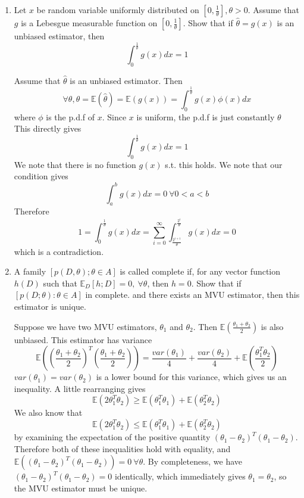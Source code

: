 \documentclass{article}
\newcommand{\chapternumber}{3}
\newenvironment{QandA}{\begin{enumerate}[label=\chapternumber.\arabic*]\bfseries\boldmath}
	{\end{enumerate}}
\newenvironment{answered}{\par\bigskip\normalfont\unboldmath}{}
\begin{document}
\begin{QandA}
		\item Let $x$ be random variable uniformly distributed on $[0,\frac{1}{\theta}],\theta>0$. Assume that $g$ is a Lebesgue measurable function on $[0,\frac{1}{\theta}]$. Show that if $\hat{\theta}=g(x)$ is an unbiased estimator, then
		\[\int_0^\frac{1}{\theta}g(x)dx=1\]
		\begin{answered}
			Assume that $\hat{\theta}$ is an unbiased estimator. Then
			\[\forall\theta,\theta=\mathbb{E}(\hat{\theta})=\mathbb{E}(g(x))=\int_0^\frac{1}{\theta}g(x)\phi(x)dx\]
			where $\phi$ is the p.d.f of $x$. Since $x$ is uniform, the p.d.f is just constantly $\theta$ This directly gives 
			\[\int_0^\frac{1}{\theta}g(x)dx=1\] We note that there is no function $g(x)$ s.t. this holds. We note that our condition gives 
			\[\int_a^bg(x)dx=0\ \forall 0<a<b\] Therefore
			\[1=\int_0^\frac{1}{\theta}g(x)dx=\sum_{i=0}^\infty\int_\frac{2^{i+1}}{\theta}^\frac{2^i}{\theta}g(x)dx=0 \]
			which is a contradiction.
		\end{answered}
	
		\item A family $[p(D,\theta);\theta\in A]$ is called complete if, for any vector function $h(D)$ such that $\mathbb{E}_D[h;D]=0,\ \forall\theta$, then $h=0$. Show that if $[p(D;\theta):\theta\in A]$ in complete. and there exists an MVU estimator, then this estimator is unique.
		\begin{answered}
			Suppose we have two MVU estimators, $\theta_1$ and $\theta_2$. Then $\mathbb{E}\left(\frac{\theta_1+\theta_2}{2}\right)$ is also unbiased. This estimator has variance
			\[\mathbb{E}\left(\left(\frac{\theta_1+\theta_2}{2}\right)^T\left(\frac{\theta_1+\theta_2}{2}\right)\right)=\frac{var(\theta_1)}{4}+\frac{var(\theta_2)}{4}+\mathbb{E}\left(\frac{\theta_1^T\theta_2}{2}\right)\]
			$var(\theta_1)=var(\theta_2)$ is a lower bound for this variance, which gives us an inequality. A little rearranging gives
			\[\mathbb{E}(2\theta_1^T\theta_2)\geq\mathbb{E}(\theta_1^T\theta_1)+\mathbb{E}(\theta_2^T\theta_2)\]
			We also know that
			\[\mathbb{E}(2\theta_1^T\theta_2)\leq\mathbb{E}(\theta_1^T\theta_1)+\mathbb{E}(\theta_2^T\theta_2)\]
			by examining the expectation of the positive quantity $(\theta_1-\theta_2)^T(\theta_1-\theta_2)$. Therefore both of these inequalities hold with equality, and $\mathbb{E}((\theta_1-\theta_2)^T(\theta_1-\theta_2))=0\ \forall \theta$. By completeness, we have $(\theta_1-\theta_2)^T(\theta_1-\theta_2)=0$ identically, which immediately gives $\theta_1=\theta_2$, so the MVU estimator must be unique.
		\end{answered}
	

\end{QandA}
\end{document}

